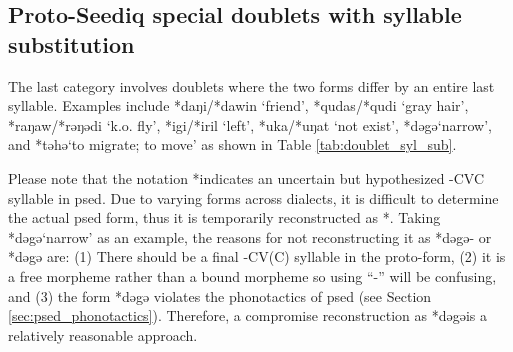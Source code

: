 \subsection{Proto-Seediq special doublets with syllable substitution} \label{sec:syl_sub}

The last category involves doublets where the two forms differ by an entire last syllable. Examples include *daŋi/*dawin `friend', *qudas/*qudi `gray hair', *raŋaw/*rəŋədi `k.o. fly', *igi/*iril `left', *uka/*uŋat `not exist', *dəgə\cvc `narrow', and *təhə\cvc `to migrate; to move' as shown in Table \ref{tab:doublet_syl_sub}. 

Please note that the notation *\cvc indicates an uncertain but hypothesized -CVC syllable in \acl{psed}. Due to varying forms across dialects, it is difficult to determine the actual \acl{psed} form, thus it is temporarily reconstructed as *\cvc. Taking *dəgə\cvc `narrow' as an example, the reasons for not reconstructing it as *dəgə- or *dəgə are: (1) There should be a final -CV(C) syllable in the proto-form, (2) it is a free morpheme rather than a bound morpheme so using ``-'' will be confusing, and (3) the form *dəgə violates the phonotactics of \acl{psed} (see Section \ref{sec:psed_phonotactics}). Therefore, a compromise reconstruction as *dəgə\cvc is a relatively reasonable approach.


